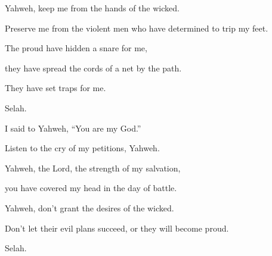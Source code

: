 {\Q {}Yahweh, keep me from the hands of the wicked.
\par }{\QB Preserve me from the violent men who have determined to trip my feet.
\par }{\Q {}The proud have hidden a snare for me,
\par }{\QB they have spread the cords of a net by the path.
\par }{\QB They have set traps for me.
\par }{\QS Selah.\par }
{\Q {}I said to Yahweh, “You are my God.”
\par }{\QB Listen to the cry of my petitions, Yahweh.
\par }{\Q {}Yahweh, the Lord, the strength of my salvation,
\par }{\QB you have covered my head in the day of battle.
\par }{\Q {}Yahweh, don’t grant the desires of the wicked.
\par }{\QB Don’t let their evil plans succeed, or they will become proud.
\par }{\QS Selah.\par }
